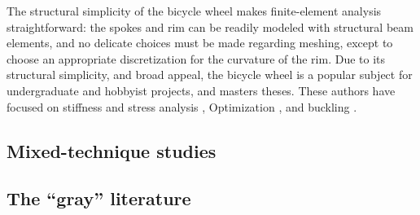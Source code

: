 \documentclass[../thesis.tex]{subfiles}
\begin{document}
The structural simplicity of the bicycle wheel makes finite-element analysis straightforward: the spokes and rim can be readily modeled with structural beam elements, and no delicate choices must be made regarding meshing, except to choose an appropriate discretization for the curvature of the rim. Due to its structural simplicity, and broad appeal, the bicycle wheel is a popular subject for undergraduate and hobbyist projects, and masters theses. These authors have focused on stiffness and stress analysis \cite{Ng,Hartz}, Optimization \cite{Keller,Svensson}, and buckling \cite{Kern}.

\subsection{Mixed-technique studies}

\subsection{The ``gray'' literature}
\end{document}
